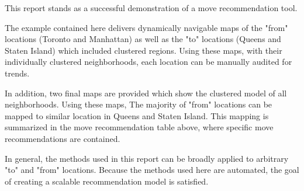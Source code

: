 \documentclass[11pt]{article}
\begin{document}
This report stands as a successful demonstration of a move
recommendation tool.

The example contained here delivers dynamically navigable maps of the
"from" locations (Toronto and Manhattan) as well as the "to" locations
(Queens and Staten Island) which included clustered regions. Using these
maps, with their individually clustered neighborhoods, each location can
be manually audited for trends.

In addition, two final maps are provided which show the clustered model
of all neighborhoods. Using these maps, The majority of "from" locations
can be mapped to similar location in Queens and Staten Island. This
mapping is summarized in the move recommendation table above, where
specific move recommendations are contained.

In general, the methods used in this report can be broadly applied to
arbitrary "to" and "from" locations. Because the methods used here are
automated, the goal of creating a scalable recommendation model is
satisfied.


    
    
    
    
\end{document}
